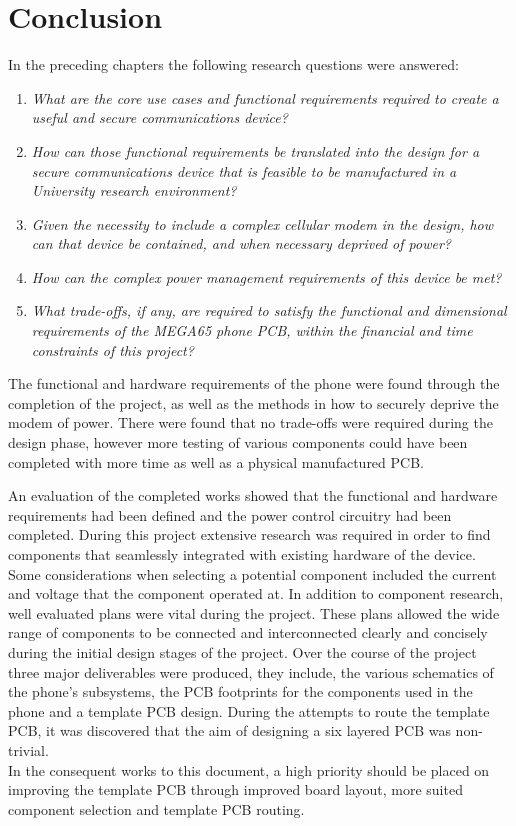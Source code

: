 
\chapter{Conclusion} %

\label{Chapter8} %

	In the preceding chapters the following research questions were answered: 
\begin{enumerate}
	\item \textit{What are the core use cases and functional requirements required to create a useful and secure communications device?}
	\item \textit{How can those functional requirements be translated into the design for a secure communications device that is feasible to be manufactured in a University research environment?}
	\item \textit{Given the necessity to include a complex cellular modem in the design, how can that device be contained, and when necessary deprived of power?}
	\item \textit{How can the complex power management requirements of this device be met?}
	\item \textit{What trade-offs, if any, are required to satisfy the functional and dimensional requirements of the MEGA65 phone PCB, within the financial and time constraints of this project?}
\end{enumerate}

	The functional and hardware requirements of the phone were found through the completion of the project, as well as the methods in how to securely deprive the modem of power. 
There were found that no trade-offs were required during the design phase, however more testing of various components could have been completed with more time as well as a physical manufactured PCB.

An evaluation of the completed works showed that the functional and hardware requirements had been defined and the power control circuitry had been completed. During this project extensive research was required in order to find components that seamlessly integrated with existing hardware of the device. 
Some considerations when selecting a potential component included the current and voltage that the component operated at. 
In addition to component research, well evaluated plans were vital during the project. 
These plans allowed the wide range of components to be connected and interconnected clearly and concisely during the initial design stages of the project. 
Over the course of the project three major deliverables were produced, they include, the various schematics of the phone's subsystems, the PCB footprints for the components used in the phone and a template PCB design. 
During the attempts to route the template PCB, it was discovered that the aim of designing a six layered PCB was non-trivial.\\
	In the consequent works to this document, a high priority should be placed on improving the template PCB through improved board layout, more suited component selection and template PCB routing. \\

